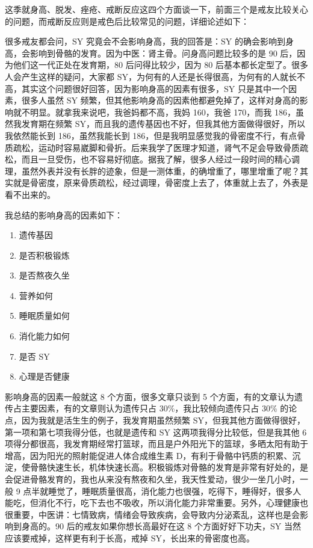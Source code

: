 \documentclass{ctexart}
\begin{document}
这季就身高、脱发、痤疮、戒断反应这四个方面谈一下，前面三个是戒友比较关心的问题，而戒断反应则是戒色后比较常见的问题，详细论述如下：

很多戒友都会问，SY 究竟会不会影响身高，我的回答是：SY 的确会影响到身高，会影响到骨骼的发育。因为中医：肾主骨。问身高问题比较多的是 90 后，因为他们这一代正处在发育期，80 后问得比较少，因为 80 后基本都长定型了。很多人会产生这样的疑问，大家都 SY，为何有的人还是长得很高，为何有的人就长不高，其实这个问题很好回答，因为影响身高的因素有很多，SY 只是其中一个因素，很多人虽然 SY 频繁，但其他影响身高的因素他都避免掉了，这样对身高的影响就不明显。就拿我来说吧，我爸妈都不高，我妈 160，我爸 170，而我 186，虽然我发育期在频繁 SY，而且我的遗传基因也不好，但我其他方面做得很好，所以我依然能长到 186，虽然我能长到 186，但是我明显感觉我的骨密度不行，有点骨质疏松，运动时容易崴脚和骨折。后来我学了医理才知道，肾气不足会导致骨质疏松，而且一旦受伤，也不容易好彻底。据我了解，很多人经过一段时间的精心调理，虽然外表并没有长胖的迹象，但是一测体重，的确增重了，哪里增重了呢？其实就是骨密度，原来骨质疏松，经过调理，骨密度上去了，体重就上去了，外表是看不出来的。

我总结的影响身高的因素如下：

\begin{enumerate}
    \item 遗传基因
    \item 是否积极锻炼
    \item 是否熬夜久坐
    \item 营养如何
    \item 睡眠质量如何
    \item 消化能力如何
    \item 是否 SY
    \item 心理是否健康
\end{enumerate}

影响身高的因素一般就这 8 个方面，很多文章只谈到 5 个方面，有的文章认为遗传占主要因素，有的文章则认为遗传只占 30\%，我比较倾向遗传只占 30\% 的论点，因为我就是活生生的例子，我发育期虽然频繁 SY，但我其他方面做得很好，第一项和第七项我得分低，也就是遗传和 SY 这两项我得分比较低，但是我其他 6 项得分都很高，我发育期经常打篮球，而且是户外阳光下的篮球，多晒太阳有助于增高，因为阳光的照射能促进人体合成维生素 D，有利于骨骼中钙质的积累、沉淀，使骨骼快速生长，机体快速长高。积极锻炼对骨骼的发育是非常有好处的，是会促进骨骼发育的，我也从来没有熬夜和久坐，我天性爱动，很少一坐几小时，一般 9 点半就睡觉了，睡眠质量很高，消化能力也很强，吃得下，睡得好，很多人能吃，但消化不行，吃下去也不吸收，所以消化能力非常重要。另外，心理健康也很重要，中医讲：七情致病，情绪会导致疾病，会导致内分泌紊乱，这样也是会影响到身高的。90 后的戒友如果你想长高最好在这 8 个方面好好下功夫，SY 当然应该要戒掉，这样更有利于长高，戒掉 SY，长出来的骨密度也高。
\end{document}
